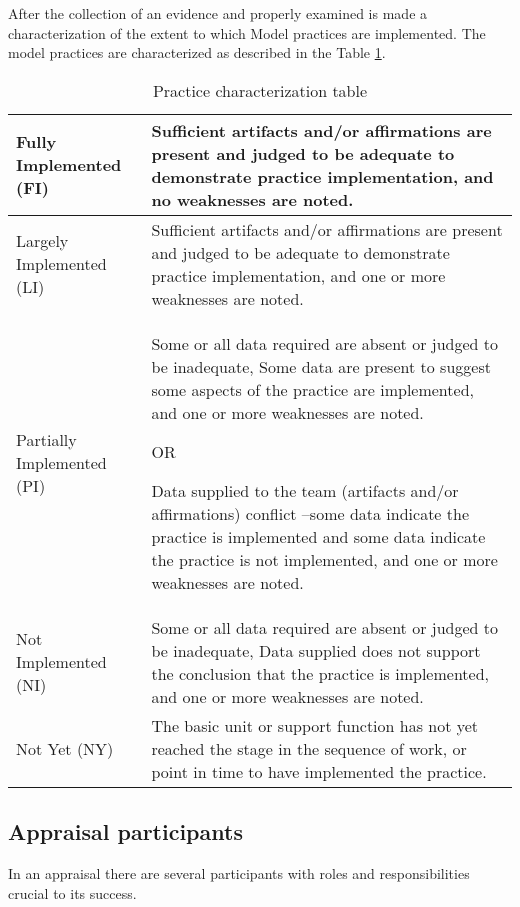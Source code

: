  
\newpage
After the collection of an evidence and properly examined is made a characterization of the extent to which Model practices are implemented. The model practices are characterized as described in the Table \ref{tab:characterizations}.
\newline

\begin{table}[h]
	\centering
	\caption{Practice characterization table}
\begin{tabular}{|p{4cm}|p{9cm}|}
\hline
Fully Implemented (FI)   & Sufficient artifacts and/or affirmations are present and
judged to be adequate to demonstrate practice implementation, and
no weaknesses are noted.    \\
\hline
Largely Implemented (LI) & Sufficient artifacts and/or affirmations are present and
judged to be adequate to demonstrate practice implementation, and
one or more weaknesses are noted.  \\ 
\hline
Partially Implemented (PI) & Some or all data required are absent or judged to be
inadequate,
Some data are present to suggest some aspects of the practice are
implemented, and
one or more weaknesses are noted.


OR


Data supplied to the team (artifacts and/or affirmations) conflict –some data
indicate the practice is implemented and some data indicate the practice is
not implemented, and
one or more weaknesses are noted.\\
\hline
Not Implemented (NI) & Some or all data required are absent or judged to be
inadequate,
Data supplied does not support the conclusion that the practice is
implemented, and
one or more weaknesses are noted. \\
\hline
Not Yet (NY) & The basic unit or support function has not yet reached the stage in the
sequence of work, or point in time to have implemented the practice. \\
\hline
\end{tabular}
\label{tab:characterizations}
\end{table}





\subsection{Appraisal participants}
In an appraisal there are several participants with roles and responsibilities crucial to its success.

